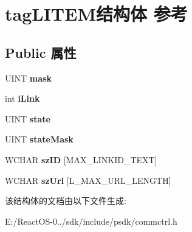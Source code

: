 \hypertarget{structtag_l_i_t_e_m}{}\section{tag\+L\+I\+T\+E\+M结构体 参考}
\label{structtag_l_i_t_e_m}
\subsection*{Public 属性}
\begin{DoxyCompactItemize}
\item 
\mbox{\label{structtag_l_i_t_e_m_a50480929bff9ae7a25fc14482e5fffe7}} 
U\+I\+NT {\bfseries mask}
\item 
\mbox{\label{structtag_l_i_t_e_m_aa92634ca25abf9b685cc321b1d3e205c}} 
int {\bfseries i\+Link}
\item 
\mbox{\label{structtag_l_i_t_e_m_abcc8b38a65addd6314817770422db886}} 
U\+I\+NT {\bfseries state}
\item 
\mbox{\label{structtag_l_i_t_e_m_a8f7b85499aff7d9fce217ed05c1f9908}} 
U\+I\+NT {\bfseries state\+Mask}
\item 
\mbox{\label{structtag_l_i_t_e_m_a9180e71ac71305d299b82e8034b86577}} 
W\+C\+H\+AR {\bfseries sz\+ID} \mbox{[}M\+A\+X\+\_\+\+L\+I\+N\+K\+I\+D\+\_\+\+T\+E\+XT\mbox{]}
\item 
\mbox{\label{structtag_l_i_t_e_m_a27b998999e4abcfc76e60cb439d3f593}} 
W\+C\+H\+AR {\bfseries sz\+Url} \mbox{[}L\+\_\+\+M\+A\+X\+\_\+\+U\+R\+L\+\_\+\+L\+E\+N\+G\+TH\mbox{]}
\end{DoxyCompactItemize}


该结构体的文档由以下文件生成\+:\begin{DoxyCompactItemize}
\item 
E\+:/\+React\+O\+S-\/0../sdk/include/psdk/commctrl.\+h\end{DoxyCompactItemize}
